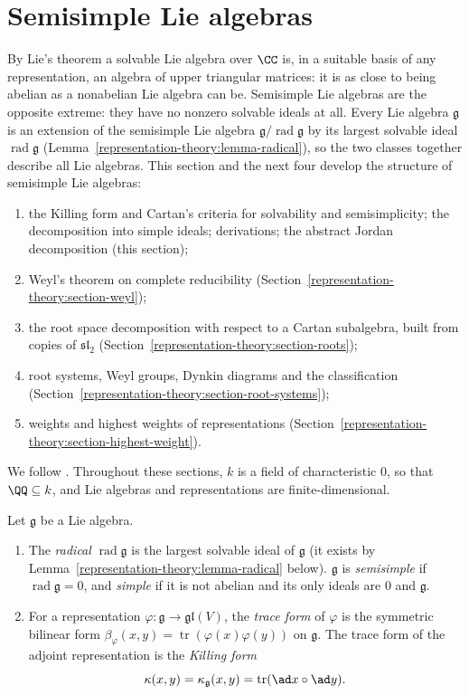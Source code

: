 \section{Semisimple Lie algebras}\label{representation-theory:section-semisimple}

By Lie's theorem a solvable Lie algebra over $\CC$ is, in a suitable basis of any representation, an algebra of upper triangular matrices: it is as close to being abelian as a
nonabelian Lie algebra can be. Semisimple Lie algebras are the opposite extreme: they have no nonzero solvable ideals at all. Every Lie algebra $\mathfrak{g}$ is an extension
of the semisimple Lie algebra $\mathfrak{g}/\operatorname{rad}\mathfrak{g}$ by its largest solvable ideal $\operatorname{rad}\mathfrak{g}$
(Lemma~\ref{representation-theory:lemma-radical}), so the two classes together describe all Lie algebras. This section and the next four develop the structure of semisimple
Lie algebras:
\begin{enumerate}
\item the Killing form and Cartan's criteria for solvability and semisimplicity; the decomposition into simple ideals; derivations; the abstract Jordan decomposition
(this section);
\item Weyl's theorem on complete reducibility (Section~\ref{representation-theory:section-weyl});
\item the root space decomposition with respect to a Cartan subalgebra, built from copies of $\mathfrak{sl}_2$ (Section~\ref{representation-theory:section-roots});
\item root systems, Weyl groups, Dynkin diagrams and the classification (Section~\ref{representation-theory:section-root-systems});
\item weights and highest weights of representations (Section~\ref{representation-theory:section-highest-weight}).
\end{enumerate}
We follow \cite[Chapters II--III and VI]{humphreys-lie}. Throughout these sections, $k$ is a field of characteristic $0$, so that $\QQ \subseteq k$, and Lie algebras and
representations are finite-dimensional.

\begin{definition}\label{representation-theory:definition-semisimple}
Let $\mathfrak{g}$ be a Lie algebra.
\begin{enumerate}
\item The \emph{radical} $\operatorname{rad}\mathfrak{g}$ is the largest solvable ideal of $\mathfrak{g}$ (it exists by Lemma~\ref{representation-theory:lemma-radical} below).
$\mathfrak{g}$ is \emph{semisimple} if $\operatorname{rad}\mathfrak{g} = 0$, and \emph{simple} if it is not abelian and its only ideals are $0$ and $\mathfrak{g}$.
\item For a representation $\varphi \colon \mathfrak{g} \to \mathfrak{gl}(V)$, the \emph{trace form} of $\varphi$ is the symmetric bilinear form
$\beta_\varphi(x, y) = \operatorname{tr}(\varphi(x)\varphi(y))$ on $\mathfrak{g}$. The trace form of the adjoint representation is the \emph{Killing form}
\[
\kappa(x, y) = \kappa_{\mathfrak{g}}(x, y) = \operatorname{tr}(\ad x \circ \ad y).
\]
\end{enumerate}
\end{definition}

